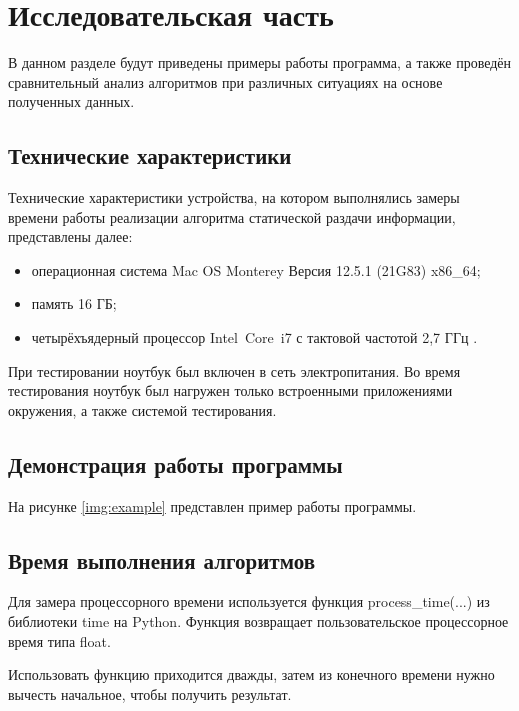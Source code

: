 \chapter{Исследовательская часть}

В данном разделе будут приведены примеры работы программа, а также проведён сравнительный анализ алгоритмов при различных ситуациях на основе полученных данных.

\section{Технические характеристики}

Технические характеристики устройства, на котором выполнялись замеры времени работы реализации алгоритма статической раздачи информации, представлены далее:

\begin{itemize}
	\item операционная система Mac OS Monterey Версия 12.5.1 (21G83) \cite{macos} x86\_64;
	\item память 16 ГБ;
	\item четырёхъядерный процессор Intel Core i7 с тактовой частотой 2,7 ГГц \cite{intel}.
\end{itemize}

При тестировании ноутбук был включен в сеть электропитания. Во время тестирования ноутбук был нагружен только встроенными приложениями окружения, а также системой тестирования.

\section{Демонстрация работы программы}

На рисунке \ref{img:example} представлен пример работы программы.

\clearpage

\section{Время выполнения алгоритмов}

Для замера процессорного времени используется функция process\_time(...) из библиотеки time на Python. Функция возвращает пользовательское процессорное время типа float.

Использовать функцию приходится дважды, затем из конечного времени нужно вычесть начальное, чтобы получить результат.

